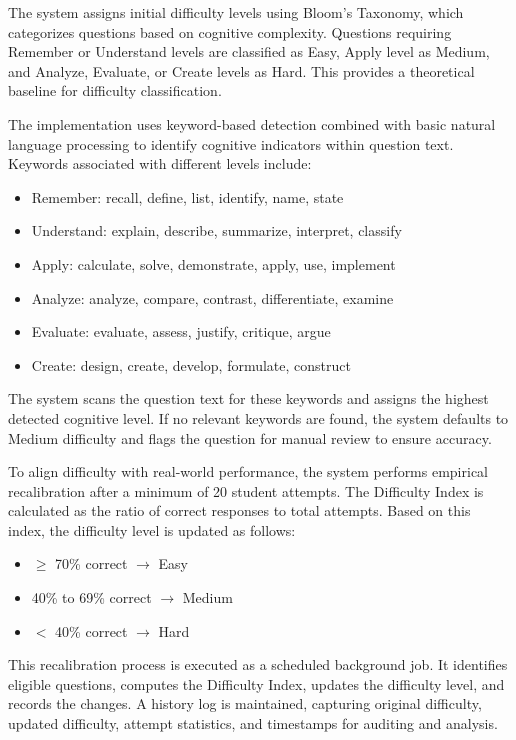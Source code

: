 \begin{sloppypar}
The system assigns initial difficulty levels using Bloom's Taxonomy, which categorizes questions based on cognitive complexity. Questions requiring Remember or Understand levels are classified as Easy, Apply level as Medium, and Analyze, Evaluate, or Create levels as Hard. This provides a theoretical baseline for difficulty classification.

The implementation uses keyword-based detection combined with basic natural language processing to identify cognitive indicators within question text. Keywords associated with different levels include:

\begin{itemize}
\item Remember: recall, define, list, identify, name, state
\item Understand: explain, describe, summarize, interpret, classify
\item Apply: calculate, solve, demonstrate, apply, use, implement
\item Analyze: analyze, compare, contrast, differentiate, examine
\item Evaluate: evaluate, assess, justify, critique, argue
\item Create: design, create, develop, formulate, construct
\end{itemize}

The system scans the question text for these keywords and assigns the highest detected cognitive level. If no relevant keywords are found, the system defaults to Medium difficulty and flags the question for manual review to ensure accuracy.

To align difficulty with real-world performance, the system performs empirical recalibration after a minimum of 20 student attempts. The Difficulty Index is calculated as the ratio of correct responses to total attempts. Based on this index, the difficulty level is updated as follows:

\begin{itemize}
\item $\geq$ 70\% correct $\rightarrow$ Easy
\item 40\% to 69\% correct $\rightarrow$ Medium
\item $<$ 40\% correct $\rightarrow$ Hard
\end{itemize}

This recalibration process is executed as a scheduled background job. It identifies eligible questions, computes the Difficulty Index, updates the difficulty level, and records the changes. A history log is maintained, capturing original difficulty, updated difficulty, attempt statistics, and timestamps for auditing and analysis.


\end{sloppypar}
